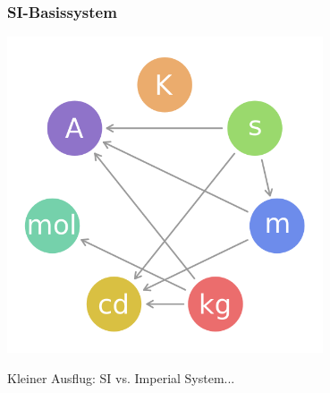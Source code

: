 \begin{frame}
    \frametitle{SI-Basissystem}

    \begin{center}
        \includegraphics[width=0.7\textwidth]{e01/SI_base_unit.png}
        \tiny \hyperlink{refs}{\cite{wc}}
    \end{center}

    Kleiner Ausflug: SI vs. Imperial System...

\end{frame}

